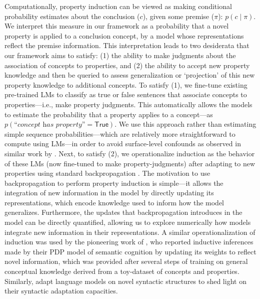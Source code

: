 \documentclass[10pt,letterpaper]{article}
\newcommand{\ake}[1]{\textcolor{blue}{$_{AE}$[#1]}}
\newcommand{\km}[1]{\textcolor{purple}{$_{KM}$[#1]}}
\newcommand{\true}{\mathsf{True}}
\begin{document}
Computationally, property induction can be viewed as making conditional probability estimates about the conclusion ($c$), given some premise ($\pi$): $p(c\mid\pi)$.
We interpret this measure in our framework as a probability that a novel property is applied to a conclusion concept, by a model whose representations reflect the premise information.
This interpretation leads to two desiderata that our framework aims to satisfy: (1) the ability to make judgments about the association of concepts to properties, and (2) the ability to accept new property knowledge and then be queried to assess generalization or `projection' of this new property knowledge to additional concepts.
To satisfy (1), we fine-tune existing pre-trained LMs to classify as true or false sentences that associate concepts to properties---i.e., make property judgments. This automatically allows the models to estimate the probability that a property applies to a concept---as $p(\textit{``concept has property''} = \true)$. 
We use this approach rather than estimating simple sequence probabilities---which are relatively more straightforward to compute using LMs---in order to avoid surface-level confounds as observed in similar work by \citet{misra2021typicality}.
Next, to satisfy (2), we operationalize induction as the behavior of these LMs (now fine-tuned to make property-judgments) after adapting to new properties using standard backpropagation \citep{rumelhart1986learning}.
The motivation to use backpropagation to perform property induction is simple---it allows the integration of new information in the model by directly updating its representations, which encode knowledge used to inform how the model generalizes. 
Furthermore, the updates that backpropagation introduces in the model can be directly quantified, allowing us to explore numerically how models integrate new information in their representations.
A similar operationalization of induction was used by the pioneering work of \citet{rogers2004semantic}, who reported inductive inferences made by their PDP model of semantic cognition by updating its weights to reflect novel information, which was provided after several steps of training on general conceptual knowledge derived from a toy-dataset of concepts and properties.
Similarly, \citet{van2018neural} adapt language models on novel syntactic structures to shed light on their syntactic adaptation capacities.
\end{document}
